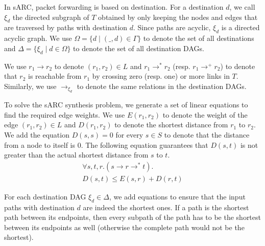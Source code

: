 In sARC, packet forwarding is based on destination.
For a destination $d$, we call $\xi_d$ the directed
subgraph of $T$ obtained by only keeping the nodes and edges 
that are traversed by paths with destination $d$.
Since paths are acyclic, $\xi_d$ is a directed acyclic graph.
We use $\Omega=\{d\mid (\_,d)\in\Gamma\}$ to denote the 
set of all destinations and $\Delta=\{\xi_d\mid d\in \Omega\}$ to denote  
the set of all destination DAGs. 

We use  $r_1\rightarrow r_2$ to denote $(r_1,r_2)\in L$ and
$r_1\rightarrow^* r_2$ (resp. $r_1\rightarrow^+ r_2$) to denote 
that $r_2$ is reachable from $r_1$ by crossing zero (resp. one) or more links in $T$.
Similarly, we use $\rightarrow_{\xi_d}$ to denote the same relations in the destination DAGs.


To solve the sARC synthesis problem, we generate a set of linear equations
to find the required edge weights. 
We use $E(r_1, r_2)$ to denote the weight of the edge $(r_1,r_2)\in L$
and 
$D(r_1, r_2)$ to denote the shortest distance from $r_1$ to $r_2$.
We add the equation $D(s,s) = 0$ for every $s\in S$ to denote that the distance
from a node to itself is $0$.
The
following equation guarantees that $D(s,t)$ is not greater than 
the actual shortest distance from $s$ to $t$.
\begin{multline} \label{eq:dist}
\forall s, t, r. (s \rightarrow r \rightarrow^* t).\\
D(s, t) \leq E(s, r) + D(r, t)
\end{multline}

For each destination DAG $\xi_d\in\Delta$, we add equations to ensure 
that the input paths with destination $d$ are indeed the shortest ones.
 If a path
is the shortest path between its endpoints, then every 
subpath of the path has to be the shortest between its endpoints
as well (otherwise the complete path would not be the shortest).

